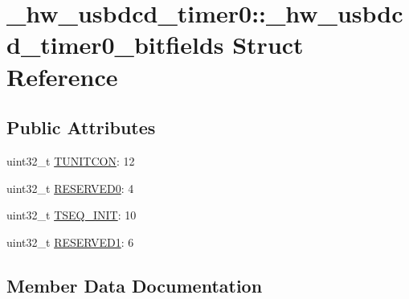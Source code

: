 \hypertarget{struct__hw__usbdcd__timer0_1_1__hw__usbdcd__timer0__bitfields}{}\section{\+\_\+hw\+\_\+usbdcd\+\_\+timer0\+:\+:\+\_\+hw\+\_\+usbdcd\+\_\+timer0\+\_\+bitfields Struct Reference}
\label{struct__hw__usbdcd__timer0_1_1__hw__usbdcd__timer0__bitfields}
\subsection*{Public Attributes}
\begin{DoxyCompactItemize}
\item 
uint32\+\_\+t \hyperlink{struct__hw__usbdcd__timer0_1_1__hw__usbdcd__timer0__bitfields_a6665e833a74af1ca55c5d4b208ff20eb}{T\+U\+N\+I\+T\+C\+ON}\+: 12
\item 
uint32\+\_\+t \hyperlink{struct__hw__usbdcd__timer0_1_1__hw__usbdcd__timer0__bitfields_a26ac065beb7c5442a117dbc560400ff5}{R\+E\+S\+E\+R\+V\+E\+D0}\+: 4
\item 
uint32\+\_\+t \hyperlink{struct__hw__usbdcd__timer0_1_1__hw__usbdcd__timer0__bitfields_a649fbee1a78fee2a8b80c1b614deb4f4}{T\+S\+E\+Q\+\_\+\+I\+N\+IT}\+: 10
\item 
uint32\+\_\+t \hyperlink{struct__hw__usbdcd__timer0_1_1__hw__usbdcd__timer0__bitfields_aa5d6cbbfb9769a927620c45b9871fb6d}{R\+E\+S\+E\+R\+V\+E\+D1}\+: 6
\end{DoxyCompactItemize}


\subsection{Member Data Documentation}
